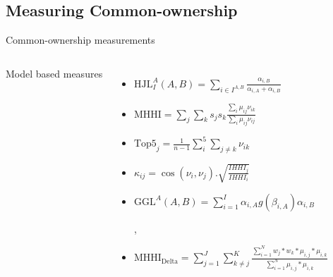 \documentclass{beamer}
\begin{document}
	\subsection{Measuring Common-ownership}
	\begin{frame}{Common-ownership measurements}\label{mainmeasure}
			\begin{columns}[t]
				\centering
				Model based measures
				\\
				
				\begin{itemize}
					\item \color{blue} \scriptsize $
					\text{HJL}_I^A(A,B) = \sum_{i\in I^{A,B}}\frac{\alpha_{i,B}}{\alpha_{i,A} + \alpha_{i,B}}     $  
					\normalcolor
					\tiny 
					
					\cite{harford2011institutional}
					
					
					\item \color{blue} \scriptsize$   \text{MHHI} = \sum_{j} \sum_k s_j s_k \frac{\sum_i \mu_{ij} \nu_{ik}}{\sum_i \mu_{ij} \nu_{ij}}   $ \tiny   \normalcolor
					
					\cite{azar2018anticompetitive}
					
					\item \color{blue} \scriptsize $   \text{Top5}_j = \frac{1}{n-1}\sum_i^5 \sum_{j\neq k} \nu_{ik}   $ \tiny \normalcolor 
					
					\cite{anton2020common} 
					
					\item \color{blue} \scriptsize $   \kappa_{ij} = \cos(\nu_i,\nu_j) . \sqrt{\frac{IHHI_j}{IHHI_i}}   $ \tiny \normalcolor 
					
					\cite{backus2020theory}
					
					\item \color{blue} \scriptsize$   \text{GGL}^A(A,B) = \sum_{i = 1}^{I} \alpha_{i,A}g(\beta_{i,A})\alpha_{i,B}   $ \tiny \normalcolor 
					
					\cite{gilje2020s} , \cite{Lewellen2021}
					
					
					\item \color{blue} \scriptsize $   \text{MHHI}_\text{Delta}= \sum_{j = 1}^{J} \sum_{k\neq j}^{K} \frac{\sum_{i = 1}^{N} w_j * w_k * \mu_{i,j} * \mu_{i,k}}{\sum_{i = 1}^{N}  \mu_{i,j} * \mu_{i,k} }  $ \tiny \normalcolor 
					
					\cite{LEWELLEN2021b}
					\normalsize
					
					
					

\end{itemize}
\end{columns}
\end{frame}
\end{document}

